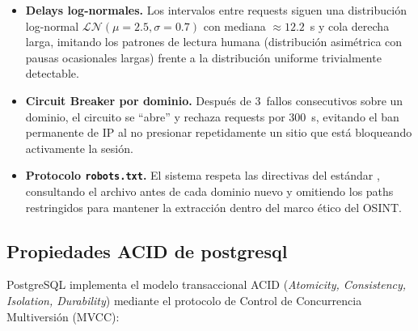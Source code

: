 \begin{itemize}
    \item \textbf{Delays log-normales.} Los intervalos entre requests siguen una
          distribución log-normal $\mathcal{LN}(\mu=2.5, \sigma=0.7)$ con
          mediana $\approx 12.2$~s y cola derecha larga, imitando los patrones
          de lectura humana (distribución asimétrica con pausas ocasionales largas)
          frente a la distribución uniforme trivialmente detectable.

    \item \textbf{Circuit Breaker por dominio.} Después de 3~fallos consecutivos
          sobre un dominio, el circuito se ``abre'' y rechaza requests por 300~s,
          evitando el ban permanente de IP al no presionar repetidamente un sitio
          que está bloqueando activamente la sesión.

    \item \textbf{Protocolo \texttt{robots.txt}.} El sistema respeta las directivas
          del estándar \cite{koster1994robots}, consultando el archivo antes de
          cada dominio nuevo y omitiendo los paths restringidos para mantener la
          extracción dentro del marco ético del OSINT.
\end{itemize}


\subsection{Propiedades ACID de postgresql}
\label{subsec:mt_acid}

PostgreSQL \cite{stonebraker1986design} implementa el modelo transaccional ACID
(\textit{Atomicity, Consistency, Isolation, Durability}) mediante el protocolo de
Control de Concurrencia Multiversión (MVCC):

